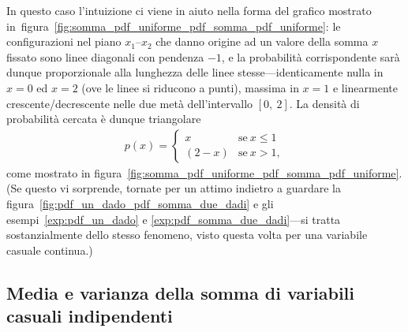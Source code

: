 In questo caso l'intuizione ci viene in aiuto nella forma del grafico mostrato
in~figura~\ref{fig:somma_pdf_uniforme_pdf_somma_pdf_uniforme}: le
configurazioni nel piano $x_1$--$x_2$ che danno origine ad un valore della somma
$x$ fissato sono linee diagonali con pendenza $-1$, e la probabilità
corrispondente sarà dunque proporzionale alla lunghezza delle linee
stesse---identicamente nulla in $x = 0$ ed $x = 2$ (ove le linee si riducono a
punti), massima in $x = 1$ e linearmente crescente/decrescente nelle due metà
dell'intervallo $[0,~2]$. La densità di probabilità cercata è dunque
triangolare
\begin{align*}
  p(x) =
  \begin{cases}
    x & \text{se}~x \leq 1\\
    (2 - x) &  \text{se}~x > 1,
  \end{cases}
\end{align*}
come mostrato in figura~\ref{fig:somma_pdf_uniforme_pdf_somma_pdf_uniforme}.
(Se questo vi sorprende, tornate per un attimo indietro a guardare la
figura~\ref{fig:pdf_un_dado_pdf_somma_due_dadi} e gli
esempi~\ref{exp:pdf_un_dado} e \ref{exp:pdf_somma_due_dadi}---si tratta
sostanzialmente dello stesso fenomeno, visto questa volta per una variabile
casuale continua.)


\subsection{Media e varianza della somma di variabili casuali indipendenti}
\label{sec:media_varianza_somma}

